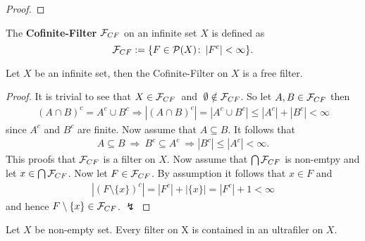 \begin{proof}
\end{proof}

\begin{defin}
  The \textbf{Cofinite-Filter} $\mathcal{F}_{CF}$ on an infinite set $X$ is defined as 
  \begin{equation*}
    \mathcal{F}_{CF} := \{ F \in \mathcal{P}(X)\colon \left| F^c \right| < \infty\}.
  \end{equation*}
\end{defin}

\begin{lemma}\label{lem:coffil}
  Let $X$ be an infinite set, then the Cofinite-Filter on $X$ is a free filter.
\end{lemma}

\begin{proof}
  It is trivial to see that $X \in \mathcal{F}_{CF}\:$ and $\:\emptyset \notin \mathcal{F}_{CF}$. So let $A, B \in \mathcal{F}_{CF}$ then
  \begin{align*}
    (A \cap B)^c = A^c \cup B^c \Rightarrow \left| (A \cap B)^c \right| = \left | A^c \cup B^c \right| \leq \left| A^c \right| + \left| B^c \right| < \infty
  \end{align*}
  since $A^c$ and $B^c$ are finite.
  Now assume that $A \subseteq B$. It follows that
  \begin{align*}
    A \subseteq B \: \Rightarrow \: B^c \subseteq A^c \: \Rightarrow \left|B^c\right| \leq \left|A^c\right| < \infty.
  \end{align*}
  This proofs that $\mathcal{F}_{CF}$ is a filter on $X$.
  Now assume that $\bigcap \mathcal{F}_{CF}$ is non-emtpy and let $x \in \bigcap \mathcal{F}_{CF}$. Now let $F \in \mathcal{F}_{CF}$. By assumption it follows that $x \in F$ and
  \begin{align*}
    \left|(F\setminus \{x\})^c\right| = \left| F^c \right| + \left| \{x \} \right| = \left| F^c \right| + 1 < \infty
  \end{align*}
  and hence $F\setminus \{x\} \in \mathcal{F}_{CF}$. $\lightning$
\end{proof}

\begin{thm}\label{thm:ulfil}
  Let $X$ be non-empty set. Every filter on X is contained in an ultrafiler on $X$.
\end{thm}

